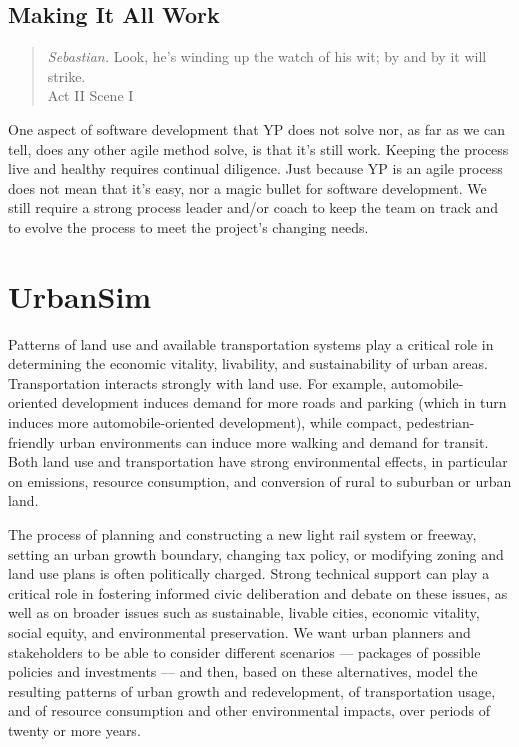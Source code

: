 \documentclass[times, 10pt,twocolumn]{article}
\begin{document}
\subsection{Making It All Work}

\begin{quote}
\emph{Sebastian.}
Look, he's winding up the watch of his wit; by and by it will strike. \\
\hspace*{1cm} Act II Scene I
\end{quote}

One aspect of software development that YP does not solve nor, as far as we
can tell, does any other agile method solve, is that it's still work.  Keeping
the process live and healthy requires continual diligence.  Just because YP is
an agile process does not mean that it's easy, nor a magic bullet for software
development. We still require a strong process leader and/or coach to keep the
team on track and to evolve the process to meet the project's changing needs.

\section{UrbanSim}
\label{urbansim}

Patterns of land use and available transportation systems play a critical
role in determining the economic vitality, livability, and sustainability
of urban areas.  Transportation interacts strongly with land use.  For
example, automobile-oriented development induces demand for more roads and
parking (which in turn induces more automobile-oriented development), while
compact, pedestrian-friendly urban environments can induce more walking and
demand for transit.  Both land use and transportation have strong
environmental effects, in particular on emissions, resource consumption,
and conversion of rural to suburban or urban land.

The process of planning and constructing a new light rail system or freeway,
setting an urban growth boundary, changing tax policy, or modifying zoning
and land use plans is often politically charged.  Strong technical support
can play a critical role in fostering informed civic deliberation and
debate on these issues, as well as on broader issues such as sustainable,
livable cities, economic vitality, social equity, and environmental
preservation.  We want urban planners and stakeholders to be able to
consider different scenarios --- packages of possible policies and
investments --- and then, based on these alternatives, model the resulting
patterns of urban growth and redevelopment, of transportation usage, and of
resource consumption and other environmental impacts, over periods of
twenty or more years.
\end{document}
